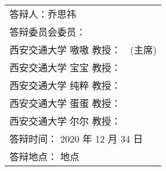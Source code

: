 \begin{titlepage}
\begin{center}
		\vspace{6cm}
		{\sanhao
			\begin{center} \renewcommand{\arraystretch}{1.5}
				\begin{tabular}{ll}
					\multicolumn{2}{l}{答辩人：乔思祎}\\
					\multicolumn{2}{l}{答辩委员会委员：}\\
					\multicolumn{1}{r}{西安交通大学 嗷嗷 教授：} & \underline{\hspace{8em}} (主席) \\
					\multicolumn{1}{r}{西安交通大学 宝宝 教授：} & \underline{\hspace{8em}} \\ 
					\multicolumn{1}{r}{\hspace{2em}西安交通大学 纯粹 教授：} & \underline{\hspace{8em}} \\
					\multicolumn{1}{r}{西安交通大学 蛋蛋 教授：} & \underline{\hspace{8em}} \\
					\multicolumn{1}{r}{西安交通大学 尔尔 教授：} & \underline{\hspace{8em}} \\
					\multicolumn{2}{l}{答辩时间： 2020 年 12 月 34 日}\\
					\multicolumn{2}{l}{答辩地点： 地点}\\
				\end{tabular} \renewcommand{\arraystretch}{1}
			\end{center} 
		}
	\end{center}
	\clearpage{\pagestyle{empty}\cleardoublepage}
\end{titlepage}
